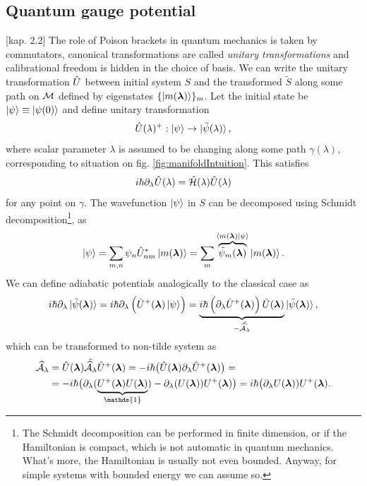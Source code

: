 \subsection{Quantum gauge potential}
\citep{kolodrubez}[kap. 2.2]
The role of Poison brackets in quantum mechanics is taken by commutators, canonical transformations are called \emph{unitary transformations} and calibrational freedom is hidden in the choice of basis. We can write the unitary transformation $\hat{U}$ between initial system $S$ and the transformed $\tilde{S}$ along some path on $\mathcal{M}$ defined by eigenstates $\{\ket{m({\bm\lambda})}\}_m$. Let the initial state be $\ket{\psi}\equiv \ket{\psi(0)}$ and define unitary transformation
\begin{equation}
    \hat{U}(\lambda)^+: \ket{\psi} \rightarrow \ket{\tilde\psi(\lambda)},
    \label{eq:transformationU}
\end{equation}
where scalar parameter $\lambda$ is assumed to be changing along some path $\gamma(\lambda)$, corresponding to situation on fig. \ref{fig:manifoldIntuition}. This satisfies
\begin{equation}
    i\hbar \partial_\lambda \hat{U}(\lambda)=\hat{\mathcal{H}}(\lambda)\hat{U}(\lambda)
\end{equation}
for any point on $\gamma$.
The wavefunction $\ket{\psi}$ in $S$ can be decomposed using Schmidt decomposition\footnote{The Schmidt decomposition can be performed in finite dimension, or if the Hamiltonian is compact, which is not automatic in quantum mechanics. What's more, the Hamiltonian is usually not even bounded. Anyway, for simple systems with bounded energy we can assume so.}, as
\begin{equation}
    \ket{\psi} = \sum_{m,n}\psi_n \hat{U}_{nm}^*\ket{m({\bm\lambda})} = \sum_m \overbrace{\tilde{\psi}_m({\bm\lambda})}^{\braket{m({\bm\lambda})|\psi}}\ket{m({\bm\lambda})}.
\end{equation}
We can define adiabatic potentials analogically to the classical case as
\begin{equation}
    i\hbar\partial_\lambda \ket{\tilde{\psi}({\bm\lambda})} = i\hbar \partial_\lambda\left(\hat{U}^+({\bm\lambda})\ket{\psi} \right)= \underbrace{i\hbar\left(\partial_\lambda \hat{U}^+({\bm\lambda})\right)\hat{U}({\bm\lambda})}_{-\tilde{\mathcal{\widehat{A}}_\lambda}}\ket{\tilde{\psi}({\bm\lambda})},
\end{equation}
which can be transformed to non-tilde system as
\begin{equation}
    \begin{split}
        \AA_\lambda&=\U(\llambda)\tilde{\AA_\lambda}\U^+(\llambda) = -i\hbar\big(\U(\llambda)\partial_\lambda \U^+(\llambda)\big) =\\
        &= -i\hbar\big(\partial_\lambda(\underbrace{U^+(\llambda)U(\llambda)}_{\mathds{1}})-\partial_\lambda(U(\llambda))U^+(\llambda) \big) =i\hbar \big(\partial_\lambda U(\llambda))U^+(\llambda).
    \end{split}
\end{equation}
